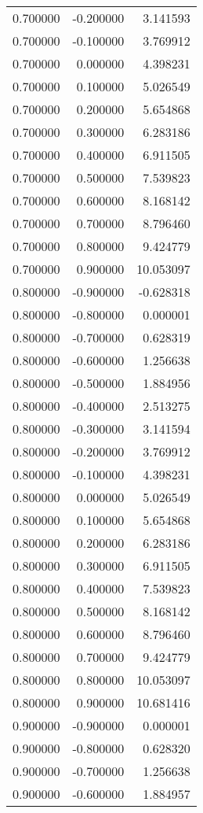 \begin{tabular}{rrr}
0.700000 & -0.200000 & 3.141593 \\
0.700000 & -0.100000 & 3.769912 \\
0.700000 & 0.000000 & 4.398231 \\
0.700000 & 0.100000 & 5.026549 \\
0.700000 & 0.200000 & 5.654868 \\
0.700000 & 0.300000 & 6.283186 \\
0.700000 & 0.400000 & 6.911505 \\
0.700000 & 0.500000 & 7.539823 \\
0.700000 & 0.600000 & 8.168142 \\
0.700000 & 0.700000 & 8.796460 \\
0.700000 & 0.800000 & 9.424779 \\
0.700000 & 0.900000 & 10.053097 \\
0.800000 & -0.900000 & -0.628318 \\
0.800000 & -0.800000 & 0.000001 \\
0.800000 & -0.700000 & 0.628319 \\
0.800000 & -0.600000 & 1.256638 \\
0.800000 & -0.500000 & 1.884956 \\
0.800000 & -0.400000 & 2.513275 \\
0.800000 & -0.300000 & 3.141594 \\
0.800000 & -0.200000 & 3.769912 \\
0.800000 & -0.100000 & 4.398231 \\
0.800000 & 0.000000 & 5.026549 \\
0.800000 & 0.100000 & 5.654868 \\
0.800000 & 0.200000 & 6.283186 \\
0.800000 & 0.300000 & 6.911505 \\
0.800000 & 0.400000 & 7.539823 \\
0.800000 & 0.500000 & 8.168142 \\
0.800000 & 0.600000 & 8.796460 \\
0.800000 & 0.700000 & 9.424779 \\
0.800000 & 0.800000 & 10.053097 \\
0.800000 & 0.900000 & 10.681416 \\
0.900000 & -0.900000 & 0.000001 \\
0.900000 & -0.800000 & 0.628320 \\
0.900000 & -0.700000 & 1.256638 \\
0.900000 & -0.600000 & 1.884957 \\

\end{tabular}
